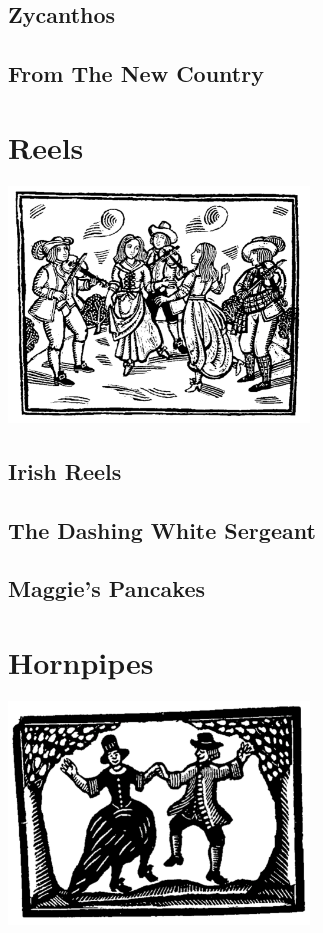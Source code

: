\documentclass[12pt]{report}
\begin{document}
\section{Zycanthos}


\newpage
\section{From The New Country}


\chapter{Reels}
\begin{center}
\includegraphics[width=8cm]{../images/reels}
\end{center}

\section{Irish Reels}


\section{The Dashing White Sergeant}


\newpage
\section{Maggie's Pancakes}


\chapter{Hornpipes}
\begin{center}
\includegraphics[width=8cm]{../images/hornpipes}
\end{center}
\end{document}

